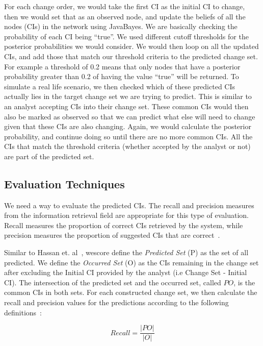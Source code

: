 \documentclass{article}
\begin{document}
For each change order, we would take the first CI as the initial CI to change, then we would set that as an observed node, and update
the beliefs of all the nodes (CIs) in the network using JavaBayes. We are basically checking the probability of each CI being ``true''. We used different
cutoff thresholds for the posterior probabilities we would consider. We would then loop on all the updated CIs, and add those that match our threshold criteria
to
the predicted change set. For example a threshold of 0.2 means that only nodes that have a posterior probability greater than 0.2 of having the value ``true''
will be returned. To simulate a real life scenario, we then checked which of these predicted CIs actually lies in the target change set we are trying to
predict. This is similar to an analyst accepting CIs into their change set. These common CIs would then also be marked as observed so that we can predict
what else will need to change given that these CIs are also changing. Again, we would calculate the posterior probability, and continue doing
so until there are no more common CIs. All the CIs that match the threshold criteria (whether accepted by the analyst or not) are part of the predicted
set.

\subsection{Evaluation Techniques}

We need a way to evaluate the predicted CIs. The recall and precision measures from the information retrieval field are appropriate for this type of evaluation.
Recall measures the proportion of correct CIs retrieved by the system, while precision measures the proportion of suggested CIs that are correct~\cite{van79}.

Similar to Hassan et. al~\cite{hassan2004predicting}, wescore define the \textit{Predicted Set} (P) as the set of all predicted. We define the \textit{Occurred
Set} (O) as the CIs remaining in the change set after excluding the Initial CI
provided by the analyst (i.e Change Set - Initial CI). The intersection of the predicted set and the occurred set, called $PO$, is the common CIs in both sets.
For each constructed change set, we then calculate the recall and precision values for the predictions according to the following
definitions~\cite{hassan2004predicting}:

\begin{equation}
\label{eqn:recall}
Recall = \frac{|PO|}{|O|}
\end{equation}
\end{document}
